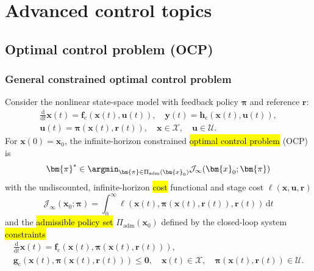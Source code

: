 
\section{Advanced control topics}


\subsection{Optimal control problem (OCP)}

\begin{frame}
	\frametitle{General constrained optimal control problem}
	Consider the nonlinear state-space model with feedback policy $\bm{\pi}$ and reference $\bm{r}$:
	\begin{equation}
		\begin{gathered}
			\frac{\mathrm{d}}{\mathrm{d}t}\bm{x}(t)=\bm{f}_\mathrm{c}(\bm{x}(t),\bm{u}(t)),
			\quad
			\bm{y}(t)=\bm{h}_\mathrm{c}(\bm{x}(t),\bm{u}(t)), \\
			\bm{u}(t)=\bm{\pi}(\bm{x}(t),\bm{r}(t)),
			\quad
			\bm{x}\in\mathcal{X},
			\quad
			\bm{u}\in\mathcal{U}.
		\end{gathered}
		\label{eq:ocp_ct_state_space}
	\end{equation}\pause%
	For $\bm{x}(0)=\bm{x}_0$, the infinite-horizon constrained \hl{optimal control problem} (OCP) is
	\begin{equation}
		\bm{\pi}^* \in \argmin_{\bm{\pi}\in\Pi_\mathrm{adm}(\bm{x}_0)}
		\mathcal{J}_\infty(\bm{x}_0;\bm{\pi})
	\end{equation}\pause%
	with the undiscounted, infinite-horizon \hl{cost} functional and stage cost $\ell(\bm{x},\bm{u},\bm{r})$
	\begin{equation}
		\mathcal{J}_\infty(\bm{x}_0;\bm{\pi})=
		\int_{0}^{\infty}
		\ell(\bm{x}(t),\bm{\pi}(\bm{x}(t),\bm{r}(t)),\bm{r}(t))\,\mathrm{d}t
		\label{eq:ocp_cost_ct}
	\end{equation}\pause%
	and the \hl{admissible policy set} $\Pi_\mathrm{adm}(\bm{x}_0)$ defined by the closed-loop system \hl{constraints}
	\begin{equation}
		\begin{gathered}
			\frac{\mathrm{d}}{\mathrm{d}t}\bm{x}(t)=
			\bm{f}_\mathrm{c}(\bm{x}(t),\bm{\pi}(\bm{x}(t),\bm{r}(t))),\\
			\bm{g}_\mathrm{c}(\bm{x}(t),\bm{\pi}(\bm{x}(t),\bm{r}(t)))\leq\bm{0},\quad
			\bm{x}(t)\in\mathcal{X},\quad
			\bm{\pi}(\bm{x}(t),\bm{r}(t))\in\mathcal{U}.
		\end{gathered}
	\end{equation}
\end{frame}

